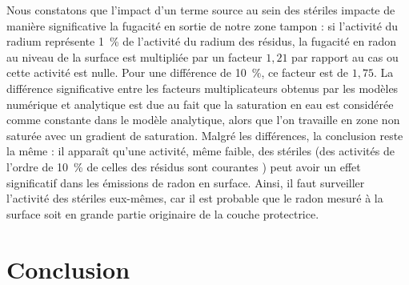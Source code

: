 \documentclass{article}
\newcommand{\blue}[1]{\textcolor{blue}{#1}} %
\begin{document}
Nous constatons que l'impact d'un terme source au sein des stériles impacte de manière significative la fugacité en sortie de notre zone tampon : si l'activité du radium représente 1~\% de l'activité du radium des résidus, la fugacité en radon au niveau de la surface est multipliée par un facteur $1,21$ par rapport au cas ou cette activité est nulle. Pour une différence de 10~\%, ce facteur est de $1,75$. La différence significative entre les facteurs multiplicateurs obtenus par les modèles numérique et analytique est due au fait que la saturation en eau est considérée comme constante dans le modèle analytique, alors que l'on travaille en zone non saturée avec un gradient de saturation. Malgré les différences, la conclusion reste la même : il apparaît qu'une activité, même faible, des stériles (des activités de l'ordre de 10~\% de celles des résidus sont courantes \cite{ferry_evaluation_2002}) peut avoir un effet significatif dans les émissions de radon en surface. Ainsi, il faut surveiller l'activité des stériles eux-mêmes, car il est probable que le radon mesuré à la surface soit en grande partie originaire de la couche protectrice.


\newpage
\section*{Conclusion}

\end{document}
